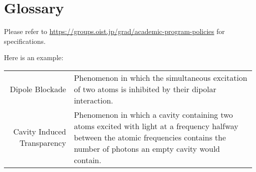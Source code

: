 \chapter*{Glossary}

Please refer to \url{https://groups.oist.jp/grad/academic-program-policies} for specifications.

Here is an example:

\begin{center}
    \begin{longtable}{r p{}}
        Dipole Blockade             & Phenomenon in which the simultaneous excitation of two atoms is inhibited by their dipolar interaction.                                                                                  \\
        Cavity Induced Transparency & Phenomenon in which a cavity containing two atoms excited with light at a frequency halfway between the atomic frequencies contains the number of photons an empty cavity would contain. \\
    \end{longtable}
\end{center}
